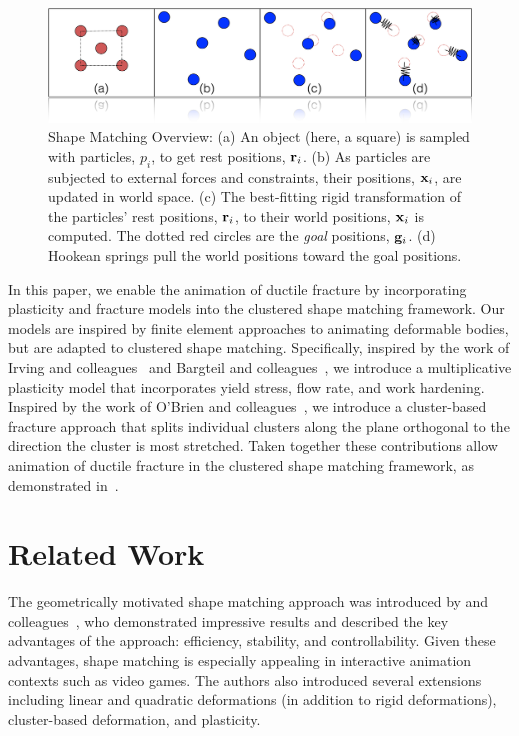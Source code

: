 \documentclass[review]{acmsiggraph}
\begin{document}
\begin{figure}
\includegraphics[width=\linewidth]{Figures/shapematching.png}
\caption{Shape Matching Overview: (a) An object (here, a square) is sampled with particles, $p_i$, to get rest positions, $\mathit{\mathbf{r}}_i$.  
(b) As particles are subjected to external forces and constraints, their positions, $\mathit{\mathbf{x}}_i$, are updated in world space.  
(c)  The best-fitting rigid transformation of the particles' rest positions, $\mathit{\mathbf{r}}_i$, 
to their world positions, $\mathit{\mathbf{x}}_i$ is computed.  The dotted red circles are the {\em goal} positions, $\mathit{\mathbf{g}}_i$.  
(d) Hookean springs pull the world positions toward the goal positions.}
\label{fig:shapematching}
\end{figure}

In this paper, we enable the animation of ductile fracture 
by incorporating plasticity and fracture models into the clustered shape matching framework.
Our models are inspired by finite element approaches to animating deformable bodies, but are adapted to 
clustered shape matching.
Specifically, inspired by the work of Irving and colleagues~ and Bargteil and 
colleagues~, we introduce a multiplicative plasticity model that incorporates
yield stress, flow rate, and work hardening.  Inspired by the work of O'Brien and colleagues~,
we introduce a cluster-based fracture approach that splits individual clusters along the plane orthogonal to the direction the 
cluster is most stretched.
Taken together these contributions allow animation of ductile fracture in the clustered shape matching framework, as demonstrated
in~.

\section{Related Work}
The geometrically motivated shape matching approach was introduced by \Mueller and 
colleagues~, who demonstrated impressive results and 
described the key advantages of the approach: efficiency, stability, and controllability.
Given these advantages, shape matching is especially appealing in interactive animation contexts such as
video games.  The authors also introduced several extensions including linear and quadratic deformations 
(in addition to rigid deformations), cluster-based deformation, and plasticity.  
\end{document}
